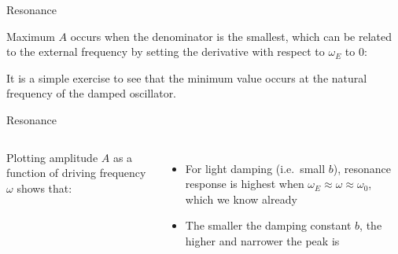 \documentclass[12pt,compress,aspectratio=169]{beamer}
\begin{document}
\begin{frame}{Resonance}
  
  Maximum $A$ occurs when the denominator is the smallest, which can be related
  to the external frequency by setting the derivative with respect to
  $\omega_E$ to 0:


  It is a simple exercise
  to see that the minimum value occurs at the natural frequency of
  the damped oscillator.

%
%  
\end{frame}



\begin{frame}{Resonance}
  \begin{columns}

    Plotting amplitude $A$ as a function of driving frequency $\omega$ shows
    that:
    \begin{itemize}
    \item For light damping (i.e.\ small $b$), resonance response is highest
      when $\omega_E\approx\omega\approx\omega_0$, which we know already
    \item The smaller the damping constant $b$, the higher and narrower the
      peak is
    \end{itemize}
  \end{columns}
\end{frame}
\end{document}
